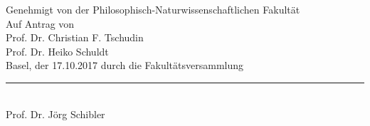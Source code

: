 \begin{center}

Genehmigt von der Philosophisch-Naturwissenschaftlichen Fakult\"at\\
Auf Antrag von\\[0.5cm]
Prof. Dr. Christian F. Tschudin\\Prof. Dr. Heiko Schuldt\\[0.5cm]

Basel, der 17.10.2017 durch die Fakult\"atsversammlung\\[2cm]
{\rule{6cm}{0.2pt}\\ Prof. Dr. J\"org Schibler}
\end{center}
\vfill\twocolumn
\begin{abstract}        
		\myabstract
\end{abstract}





